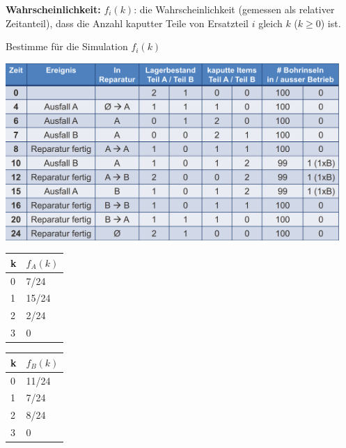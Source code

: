 \textbf{Wahrscheinlichkeit:} $f_i(k)$: die Wahrscheinlichkeit (gemessen als relativer Zeitanteil), dass die Anzahl kaputter Teile von Ersatzteil $i$ gleich $k$ ($k \geq 0$) ist.
\begin{example}
	Bestimme für die Simulation $f_i(k)$ \\
	\begin{minipage}[h]{0.7\textwidth}
		\includegraphics[width=0.95\textwidth]{pictures/reparatur} 
	\end{minipage}
	\begin{minipage}[h]{0.15\textwidth}
		\begin{tabular}{|l|l|}
			\hline
			k & $f_A(k)$ \\ \hline
			0 & 7/24 \\ \hline
			1 & 15/24 \\ \hline
			2 & 2/24 \\ \hline
			3 & 0 \\ \hline
		\end{tabular}
		\begin{tabular}{|l|l|}
			\hline
			k & $f_B(k)$ \\ \hline
			0 & 11/24 \\ \hline
			1 & 7/24 \\ \hline
			2 & 8/24 \\ \hline
			3 & 0 \\ \hline
		\end{tabular}
	\end{minipage}
\end{example}